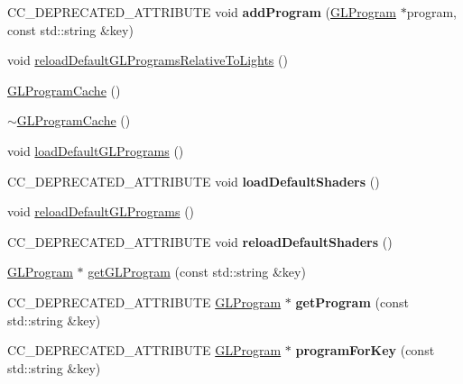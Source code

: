 \begin{DoxyCompactItemize}
\item 
\mbox{\label{classGLProgramCache_a007167409343572fbf9839a83b80ee14}} 
C\+C\+\_\+\+D\+E\+P\+R\+E\+C\+A\+T\+E\+D\+\_\+\+A\+T\+T\+R\+I\+B\+U\+TE void {\bfseries add\+Program} (\hyperlink{classGLProgram}{G\+L\+Program} $\ast$program, const std\+::string \&key)
\item 
void \hyperlink{classGLProgramCache_a8b95bc69d3474d3678e39d45a042c980}{reload\+Default\+G\+L\+Programs\+Relative\+To\+Lights} ()
\item 
\hyperlink{classGLProgramCache_a6a4da5461d3f7d0dee493a1b7ccf6261}{G\+L\+Program\+Cache} ()
\item 
\hyperlink{classGLProgramCache_a2374ee8aab9567f68aa52ab35301db45}{$\sim$\+G\+L\+Program\+Cache} ()
\item 
void \hyperlink{classGLProgramCache_a4317e3ad0ecbd5696ae3d0006da2cddd}{load\+Default\+G\+L\+Programs} ()
\item 
\mbox{\label{classGLProgramCache_af135905a5c8701d6db4472b4cab247fb}} 
C\+C\+\_\+\+D\+E\+P\+R\+E\+C\+A\+T\+E\+D\+\_\+\+A\+T\+T\+R\+I\+B\+U\+TE void {\bfseries load\+Default\+Shaders} ()
\item 
void \hyperlink{classGLProgramCache_a8405ebabc9102acb46c6f17beae701f6}{reload\+Default\+G\+L\+Programs} ()
\item 
\mbox{\label{classGLProgramCache_aff94e098b35f2f9202d017db1f426efd}} 
C\+C\+\_\+\+D\+E\+P\+R\+E\+C\+A\+T\+E\+D\+\_\+\+A\+T\+T\+R\+I\+B\+U\+TE void {\bfseries reload\+Default\+Shaders} ()
\item 
\hyperlink{classGLProgram}{G\+L\+Program} $\ast$ \hyperlink{classGLProgramCache_a0a245892227ed273bba1b3db68e18f66}{get\+G\+L\+Program} (const std\+::string \&key)
\item 
\mbox{\label{classGLProgramCache_a067162a62910fed78cebf47c0fb54a23}} 
C\+C\+\_\+\+D\+E\+P\+R\+E\+C\+A\+T\+E\+D\+\_\+\+A\+T\+T\+R\+I\+B\+U\+TE \hyperlink{classGLProgram}{G\+L\+Program} $\ast$ {\bfseries get\+Program} (const std\+::string \&key)
\item 
\mbox{\label{classGLProgramCache_a76417ac01e21da7a14a951fb833b4cd8}} 
C\+C\+\_\+\+D\+E\+P\+R\+E\+C\+A\+T\+E\+D\+\_\+\+A\+T\+T\+R\+I\+B\+U\+TE \hyperlink{classGLProgram}{G\+L\+Program} $\ast$ {\bfseries program\+For\+Key} (const std\+::string \&key)

\end{DoxyCompactItemize}
